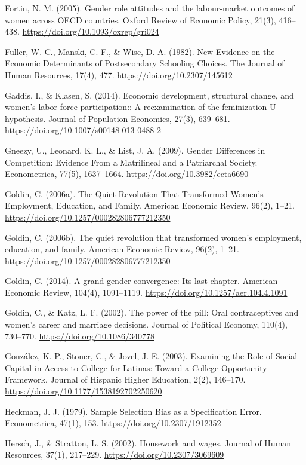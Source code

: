 Fortin, N. M. (2005). Gender role attitudes and the labour-market outcomes of women across OECD countries. Oxford Review of Economic Policy, 21(3), 416–438. \url{https://doi.org/10.1093/oxrep/gri024}

Fuller, W. C., Manski, C. F., \& Wise, D. A. (1982). New Evidence on the Economic Determinants of Postsecondary Schooling Choices. The Journal of Human Resources, 17(4), 477. \url{https://doi.org/10.2307/145612}

Gaddis, I., \& Klasen, S. (2014). Economic development, structural change, and women's labor force participation:: A reexamination of the feminization U hypothesis. Journal of Population Economics, 27(3), 639–681. \url{https://doi.org/10.1007/s00148-013-0488-2}

Gneezy, U., Leonard, K. L., \& List, J. A. (2009). Gender Differences in Competition: Evidence From a Matrilineal and a Patriarchal Society. Econometrica, 77(5), 1637–1664. \url{https://doi.org/10.3982/ecta6690}

Goldin, C. (2006a). The Quiet Revolution That Transformed Women's Employment, Education, and Family. American Economic Review, 96(2), 1–21. \url{https://doi.org/10.1257/000282806777212350}

Goldin, C. (2006b). The quiet revolution that transformed women's employment, education, and family. American Economic Review, 96(2), 1–21. \url{https://doi.org/10.1257/000282806777212350}

Goldin, C. (2014). A grand gender convergence: Its last chapter. American Economic Review, 104(4), 1091–1119. \url{https://doi.org/10.1257/aer.104.4.1091}

Goldin, C., \& Katz, L. F. (2002). The power of the pill: Oral contraceptives and women's career and marriage decisions. Journal of Political Economy, 110(4), 730–770. \url{https://doi.org/10.1086/340778}

González, K. P., Stoner, C., \& Jovel, J. E. (2003). Examining the Role of Social Capital in Access to College for Latinas: Toward a College Opportunity Framework. Journal of Hispanic Higher Education, 2(2), 146–170. \url{https://doi.org/10.1177/1538192702250620}

Heckman, J. J. (1979). Sample Selection Bias as a Specification Error. Econometrica, 47(1), 153. \url{https://doi.org/10.2307/1912352}

Hersch, J., \& Stratton, L. S. (2002). Housework and wages. Journal of Human Resources, 37(1), 217–229. \url{https://doi.org/10.2307/3069609}

